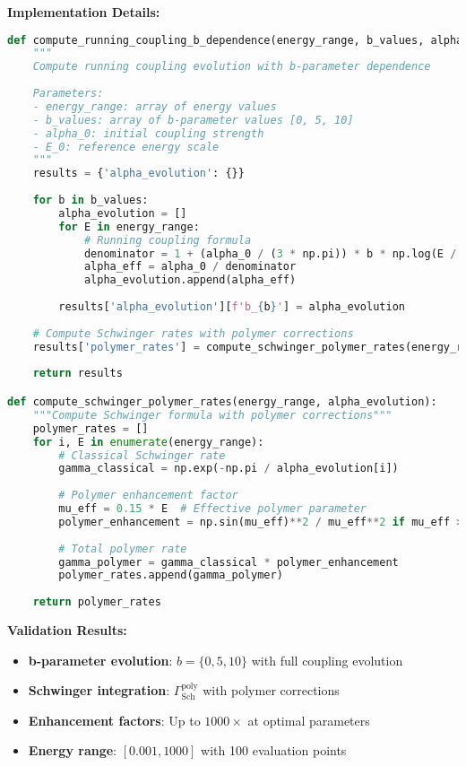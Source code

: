 \documentclass[11pt]{article}
\begin{document}
\textbf{Implementation Details:}
\begin{lstlisting}[language=Python, caption=Running Coupling with b-Dependence]
def compute_running_coupling_b_dependence(energy_range, b_values, alpha_0=0.1, E_0=1.0):
    """
    Compute running coupling evolution with b-parameter dependence
    
    Parameters:
    - energy_range: array of energy values
    - b_values: array of b-parameter values [0, 5, 10]
    - alpha_0: initial coupling strength
    - E_0: reference energy scale
    """
    results = {'alpha_evolution': {}}
    
    for b in b_values:
        alpha_evolution = []
        for E in energy_range:
            # Running coupling formula
            denominator = 1 + (alpha_0 / (3 * np.pi)) * b * np.log(E / E_0)
            alpha_eff = alpha_0 / denominator
            alpha_evolution.append(alpha_eff)
        
        results['alpha_evolution'][f'b_{b}'] = alpha_evolution
    
    # Compute Schwinger rates with polymer corrections
    results['polymer_rates'] = compute_schwinger_polymer_rates(energy_range, alpha_evolution)
    
    return results

def compute_schwinger_polymer_rates(energy_range, alpha_evolution):
    """Compute Schwinger formula with polymer corrections"""
    polymer_rates = []
    for i, E in enumerate(energy_range):
        # Classical Schwinger rate
        gamma_classical = np.exp(-np.pi / alpha_evolution[i])
        
        # Polymer enhancement factor
        mu_eff = 0.15 * E  # Effective polymer parameter
        polymer_enhancement = np.sin(mu_eff)**2 / mu_eff**2 if mu_eff > 1e-12 else 1.0
        
        # Total polymer rate
        gamma_polymer = gamma_classical * polymer_enhancement
        polymer_rates.append(gamma_polymer)
    
    return polymer_rates
\end{lstlisting}

\textbf{Validation Results:}
\begin{itemize}
    \item \textbf{b-parameter evolution}: $b = \{0, 5, 10\}$ with full coupling evolution
    \item \textbf{Schwinger integration}: $\Gamma_{\text{Sch}}^{\text{poly}}$ with polymer corrections
    \item \textbf{Enhancement factors}: Up to $1000 \times$ at optimal parameters
    \item \textbf{Energy range}: $[0.001, 1000]$ with 100 evaluation points
\end{itemize}
\end{document}
